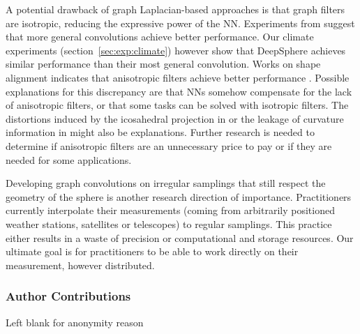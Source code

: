 \documentclass{article} %
\newcommand{\todo}[1]{{\color[rgb]{.6,.1,.6}{#1}}}
\renewcommand{\secref}[1]{section~\ref{sec:#1}}
\begin{document}
A potential drawback of graph Laplacian-based approaches is that graph filters are isotropic, reducing the expressive power of the NN.
Experiments from \citet{cohen2019gauge} suggest that more general convolutions achieve better performance.
Our climate experiments (\secref{exp:climate}) however show that DeepSphere achieves similar performance than their most general convolution.
Works on shape alignment indicates that anisotropic filters achieve better performance \todo{[Bronstein]}.
Possible explanations for this discrepancy are that NNs somehow compensate for the lack of anisotropic filters, or that some tasks can be solved with isotropic filters.
The distortions induced by the icosahedral projection in \citep{cohen2019gauge} or the leakage of curvature information in \todo{[Bronstein]} might also be explanations.
Further research is needed to determine if anisotropic filters are an unnecessary price to pay or if they are needed for some applications.

Developing graph convolutions on irregular samplings that still respect the geometry of the sphere is another research direction of importance.
Practitioners currently interpolate their measurements (coming from arbitrarily positioned weather stations, satellites or telescopes) to regular samplings.
This practice either results in a waste of precision or computational and storage resources.
Our ultimate goal is for practitioners to be able to work directly on their measurement, however distributed.



\newpage
\subsubsection*{Author Contributions}
Left blank for anonymity reason
\end{document}
